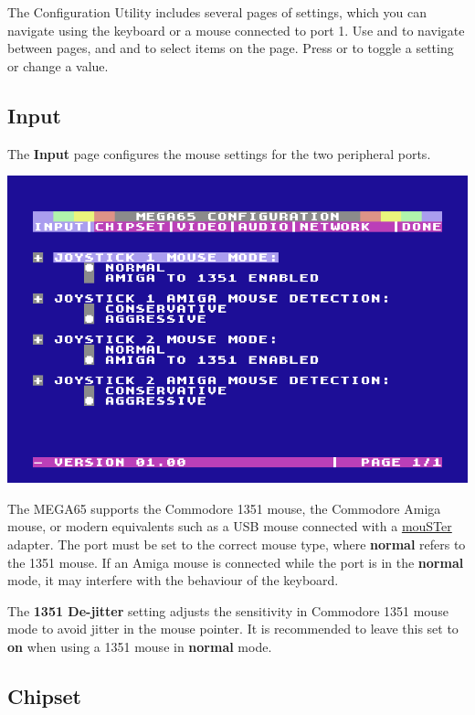 The Configuration Utility includes several pages of settings, which you can navigate using the keyboard or a mouse connected to port 1. Use \megakey{$\leftarrow$} and \megakey{$\rightarrow$} to navigate between pages, and \megakey{$\uparrow$} and \megakey{$\downarrow$} to select items on the page. Press  or  to toggle a setting or change a value.

\subsection{Input}

The {\bf Input} page configures the mouse settings for the two peripheral ports.

\begin{center}
  \includegraphics[width=0.7\linewidth]{images/ss-m65config-1.png}
\end{center}

The MEGA65 supports the Commodore 1351 mouse, the Commodore Amiga mouse, or modern equivalents such as a USB mouse connected with a \href{https://retrohax.net/shop/amiga/mouster/}{mouSTer} adapter. The port must be set to the correct mouse type, where {\bf normal} refers to the 1351 mouse. If an Amiga mouse is connected while the port is in the {\bf normal} mode, it may interfere with the behaviour of the keyboard.

The {\bf 1351 De-jitter} setting adjusts the sensitivity in Commodore 1351 mouse mode to avoid jitter in the mouse pointer. It is recommended to leave this set to {\bf on} when using a 1351 mouse in {\bf normal} mode.

\subsection{Chipset}

